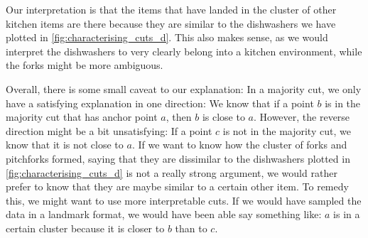 Our interpretation is that the items that have landed in the cluster of other kitchen items are there because they are similar to
the dishwashers we have plotted in \autoref{fig:characterising_cuts_d}. This also makes sense, as we would interpret the dishwashers to very clearly belong into a kitchen environment, while the forks might be more ambiguous.

Overall, there is some small caveat to our explanation: In a majority cut, we only have a satisfying explanation in one direction: We know that if a point $b$ is in the majority cut that has anchor point $a$, 
then $b$ is close to $a$. However, the reverse direction might be a bit unsatisfying: If a point $c$ is not in the majority cut, we know that it is not close to $a$. If we want to know how the cluster
of forks and pitchforks formed, saying that they are dissimilar to the dishwashers plotted in \autoref{fig:characterising_cuts_d} is not a really strong argument, we would rather prefer to know that they are maybe
similar to a certain other item. To remedy this, we might want to use more interpretable cuts. If we would have sampled the data in a landmark format, we would have been able say something like: $a$ is in a certain cluster
because it is closer to $b$ than to $c$.



